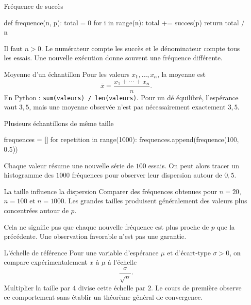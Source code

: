 \documentclass[aspectratio=169,12pt]{beamer}
\begin{document}
\renewcommand{\slidekind}{COMPRENDRE}
\begin{frame}[t,fragile]{Fréquence de succès}
\begin{codepython}
def frequence(n, p):
    total = 0
    for i in range(n):
        total += succes(p)
    return total / n
\end{codepython}
Il faut $n>0$. Le numérateur compte les succès et le dénominateur compte tous les essais. Une nouvelle exécution donne souvent une fréquence différente.
\end{frame}
\renewcommand{\slidekind}{COMPRENDRE}
\begin{frame}[t,fragile]{Moyenne d’un échantillon}
Pour les valeurs $x_1,\ldots,x_n$, la moyenne est\[\overline x=\frac{x_1+\cdots+x_n}{n}.\] En Python : \texttt{sum(valeurs) / len(valeurs)}. Pour un dé équilibré, l’espérance vaut $3,5$, mais une moyenne observée n’est pas nécessairement exactement $3,5$.
\end{frame}
\renewcommand{\slidekind}{COMPRENDRE}
\begin{frame}[t,fragile]{Plusieurs échantillons de même taille}
\begin{codepython}
frequences = []
for repetition in range(1000):
    frequences.append(frequence(100, 0.5))
\end{codepython}
Chaque valeur résume une nouvelle série de $100$ essais. On peut alors tracer un histogramme des $1000$ fréquences pour observer leur dispersion autour de $0,5$.
\end{frame}
\renewcommand{\slidekind}{COMPRENDRE}
\begin{frame}[t,fragile]{La taille influence la dispersion}
Comparer des fréquences obtenues pour $n=20$, $n=100$ et $n=1000$. Les grandes tailles produisent généralement des valeurs plus concentrées autour de $p$.\medskip\par Cela ne signifie pas que chaque nouvelle fréquence est plus proche de $p$ que la précédente. Une observation favorable n’est pas une garantie.
\end{frame}
\renewcommand{\slidekind}{COMPRENDRE}
\begin{frame}[t,fragile]{L’échelle de référence}
Pour une variable d’espérance $\mu$ et d’écart-type $\sigma>0$, on compare expérimentalement $\overline x$ à $\mu$ à l’échelle\[\frac{\sigma}{\sqrt n}.\] Multiplier la taille par $4$ divise cette échelle par $2$. Le cours de première observe ce comportement sans établir un théorème général de convergence.
\end{frame}
\renewcommand{\slidekind}{COMPRENDRE}
\end{document}
